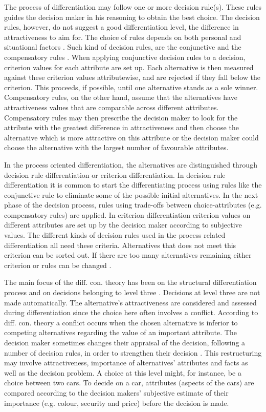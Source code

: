 \documentclass[jou,draftfirst,11pt]{apa6}
\begin{document}
The process of differentiation may follow one or more decision
rule(s).  These rules guides the decision maker in his reasoning to
obtain the best choice.  The decision rules, however, do not suggest a
good differentiation level, the difference in attractiveness to aim
for.  The choice of rules depends on both personal and situational
factors \parencite{svensson92b}.  Such kind of decision rules, are the
conjunctive and the compensatory rules \parencite{Svensson96}.  When
applying conjunctive decision rules to a decision, criterion values
for each attribute are set up.  Each alternative is then measured
against these criterion values attributewise, and are rejected if they
fall below the criterion.  This proceeds, if possible, until one
alternative stands as a sole winner.  Compensatory rules, on the other
hand, assume that the alternatives have attractiveness values that are
comparable across different attributes.  Compensatory rules may then
prescribe the decision maker to look for the attribute with the
greatest difference in attractiveness and then choose the alternative
which is more attractive on this attribute or the decision maker could
choose the alternative with the largest number of favourable
attributes.

In the process oriented differentiation, the alternatives are
distinguished through decision rule differentiation or criterion
differentiation.  In decision rule differentiation it is common to
start the differentiating process using rules like the conjunctive
rule to eliminate some of the possible initial alternatives.  In the
next phase of the decision process, rules using trade-offs between
choice-attributes (e.g. compensatory rules) are applied.  In criterion
differentiation criterion values on different attributes are set up by
the decision maker according to subjective values.  The different
kinds of decision rules used in the process related differentiation
all need these criteria.  Alternatives that does not meet this
criterion can be sorted out.  If there are too many alternatives
remaining either criterion or rules can be changed \parencite{Svensson96}.

 The main focus of the diff. con. theory has been on the structural
 differentiation process and on decisions belonging to level three .
 Decisions at level three are not made automatically. The
 alternative's attractiveness are considered and assessed during
 differentiation since the choice here often involves a conflict.
 According to diff. con. theory a conflict occurs when the chosen
 alternative is inferior to competing alternatives regarding the value
 of an important attribute.  The decision maker sometimes changes
 their appraisal of the decision, following a number of decision
 rules, in order to strengthen their decision \parencite{Svensson95}.
 This restructuring may involve attractiveness, importance of
 alternatives' attributes and facts as well as the decision problem.
 A choice at this level might, for instance, be a choice between two
 cars.  To decide on a car, attributes (aspects of the cars) are
 compared according to the decision makers' subjective estimate of
 their importance (e.g. colour, security and price) before the
 decision is made.
\end{document}
